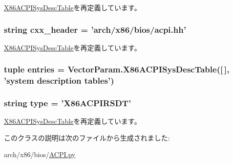 \hyperlink{classACPI_1_1X86ACPISysDescTable_a58cd55cd4023648e138237cfc0822ae3}{X86ACPISysDescTable}を再定義しています。\hypertarget{classACPI_1_1X86ACPIRSDT_a17da7064bc5c518791f0c891eff05fda}{
\subsubsection[{cxx\_\-header}]{\setlength{\rightskip}{0pt plus 5cm}string {\bf cxx\_\-header} = 'arch/x86/bios/acpi.hh'}}
\label{classACPI_1_1X86ACPIRSDT_a17da7064bc5c518791f0c891eff05fda}


\hyperlink{classACPI_1_1X86ACPISysDescTable_a17da7064bc5c518791f0c891eff05fda}{X86ACPISysDescTable}を再定義しています。\hypertarget{classACPI_1_1X86ACPIRSDT_aa7b3bf5cf82e2cb9b7cea7a35c454576}{
\subsubsection[{entries}]{\setlength{\rightskip}{0pt plus 5cm}tuple {\bf entries} = VectorParam.X86ACPISysDescTable(\mbox{[}$\,$\mbox{]}, 'system description tables')}}
\label{classACPI_1_1X86ACPIRSDT_aa7b3bf5cf82e2cb9b7cea7a35c454576}
\hypertarget{classACPI_1_1X86ACPIRSDT_acce15679d830831b0bbe8ebc2a60b2ca}{
\subsubsection[{type}]{\setlength{\rightskip}{0pt plus 5cm}string {\bf type} = '{\bf X86ACPIRSDT}'}}
\label{classACPI_1_1X86ACPIRSDT_acce15679d830831b0bbe8ebc2a60b2ca}


\hyperlink{classACPI_1_1X86ACPISysDescTable_acce15679d830831b0bbe8ebc2a60b2ca}{X86ACPISysDescTable}を再定義しています。

このクラスの説明は次のファイルから生成されました:\begin{DoxyCompactItemize}
\item 
arch/x86/bios/\hyperlink{ACPI_8py}{ACPI.py}\end{DoxyCompactItemize}
